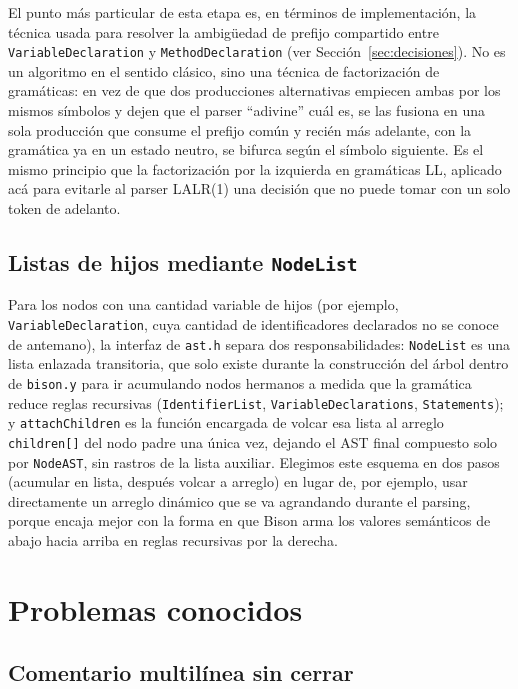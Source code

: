 \documentclass[11pt,a4paper]{article}
\begin{document}
El punto más particular de esta etapa es, en términos de implementación, la
técnica usada para resolver la ambigüedad de prefijo compartido entre
\texttt{VariableDeclaration} y \texttt{MethodDeclaration} (ver
Sección~\ref{sec:decisiones}). No es un algoritmo en el sentido clásico, sino
una técnica de factorización de gramáticas: en vez de que dos producciones
alternativas empiecen ambas por los mismos símbolos y dejen que el parser
``adivine'' cuál es, se las fusiona en una sola producción que consume el
prefijo común y recién más adelante, con la gramática ya en un estado neutro,
se bifurca según el símbolo siguiente. Es el mismo principio que la
factorización por la izquierda en gramáticas LL, aplicado acá para evitarle
al parser LALR(1) una decisión que no puede tomar con un solo token de
adelanto.

\subsection{Listas de hijos mediante \texttt{NodeList}}

Para los nodos con una cantidad variable de hijos (por ejemplo,
\texttt{VariableDeclaration}, cuya cantidad de identificadores declarados no
se conoce de antemano), la interfaz de \texttt{ast.h} separa dos
responsabilidades: \texttt{NodeList} es una lista enlazada transitoria, que
solo existe durante la construcción del árbol dentro de \texttt{bison.y} para
ir acumulando nodos hermanos a medida que la gramática reduce reglas
recursivas (\texttt{IdentifierList}, \texttt{VariableDeclarations},
\texttt{Statements}); y \texttt{attachChildren} es la función encargada de
volcar esa lista al arreglo \texttt{children[]} del nodo padre una única vez,
dejando el AST final compuesto solo por \texttt{NodeAST}, sin rastros de la
lista auxiliar. Elegimos este esquema en dos pasos (acumular en lista,
después volcar a arreglo) en lugar de, por ejemplo, usar directamente un
arreglo dinámico que se va agrandando durante el parsing, porque encaja mejor
con la forma en que Bison arma los valores semánticos de abajo hacia arriba
en reglas recursivas por la derecha.

\section{Problemas conocidos}
\label{sec:problemas}

\subsection{Comentario multilínea sin cerrar}
\end{document}
